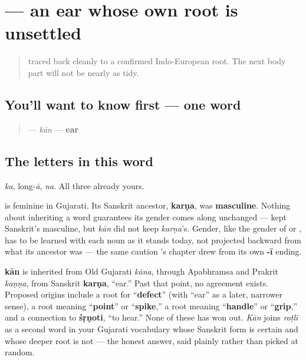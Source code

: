 \section[kān]{ — an ear whose own root is unsettled}

\label{lesson:GU-C12-kaan}



\begin{quote}
\textbf{} traced back cleanly to a confirmed Indo-European root. The next body part will not be nearly as tidy.
\end{quote}

\subsection*{You'll want to know first — one word}
\begin{quote}
\textbf{} — \emph{kān} — \textbf{ear}
\end{quote}

\subsection*{The letters in this word}
\textbf{} \emph{ka}, \textbf{} long-\emph{ā}, \textbf{} \emph{na}. All three already yours.

\begin{grammarlens}[title={Grammar Lens: a gender that changed on the way here}]
\textbf{} is feminine in Gujarati. Its Sanskrit ancestor, \textbf{karṇa}, was \textbf{masculine}. Nothing about inheriting a word guarantees its gender comes along unchanged — \textbf{} kept Sanskrit's masculine, but \emph{kān} did not keep \emph{karṇa}'s. Gender, like the gender of \textbf{} or \textbf{}, has to be learned with each noun as it stands today, not projected backward from what its ancestor was — the same caution \textbf{}'s chapter drew from its own \textbf{-ī} ending.
\end{grammarlens}

\begin{cousinweb}
\textbf{kān} is inherited from Old Gujarati \emph{kāna}, through Apabhramsa and Prakrit \emph{kaṇṇa}, from Sanskrit \textbf{karṇa}, \textquotedblleft{}ear.\textquotedblright{} Past that point, no agreement exists. Proposed origins include a root for \textquotedblleft{}\textbf{defect}\textquotedblright{} (with \textquotedblleft{}ear\textquotedblright{} as a later, narrower sense), a root meaning \textquotedblleft{}\textbf{point}\textquotedblright{} or \textquotedblleft{}\textbf{spike},\textquotedblright{} a root meaning \textquotedblleft{}\textbf{handle}\textquotedblright{} or \textquotedblleft{}\textbf{grip},\textquotedblright{} and a connection to \textbf{śṛṇoti}, \textquotedblleft{}to hear.\textquotedblright{} None of these has won out. \emph{Kān} joins \emph{roṭlī} as a second word in your Gujarati vocabulary whose Sanskrit form is certain and whose deeper root is not — the honest answer, said plainly rather than picked at random.
\end{cousinweb}

